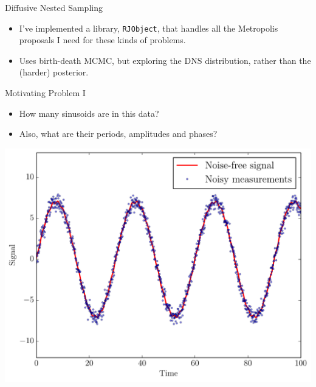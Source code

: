 \begin{frame}[t]{Diffusive Nested Sampling}
\begin{itemize}
\setlength{\itemsep}{20pt}
\item I've implemented a library, {\tt RJObject}, that handles all the
Metropolis proposals I need for these kinds of problems.
\item Uses birth-death MCMC, but exploring the DNS distribution, rather than
the (harder) posterior.
\end{itemize}
\end{frame}

\begin{frame}[t]{Motivating Problem I}
\begin{itemize}
\item How many sinusoids are in this data?
\item Also, what are their periods, amplitudes and phases?
\end{itemize}
\begin{center}
\includegraphics[scale=0.35]{sinewave_data.pdf}
\end{center}
\end{frame}

